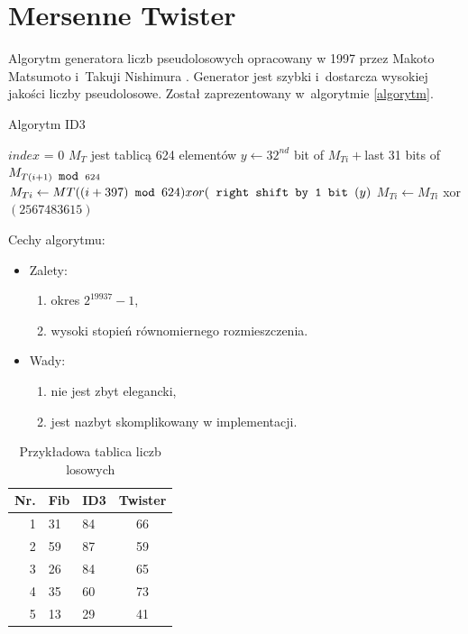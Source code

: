 \documentclass[12pt,a4paper]{article}
\begin{document}
\section{Mersenne Twister}
Algorytm generatora liczb pseudolosowych opracowany w 1997 przez Makoto
Matsumoto i~Takuji Nishimura \cite{klucz2}. Generator jest szybki i~dostarcza wysokiej
jakości liczby pseudolosowe. Został zaprezentowany w~algorytmie \ref{algorytm}.\\
\begin{algorithm}[h!]
\caption{Algorytm ID3}
\label{algorytm}
\begin{algorithmic}[1]
\REQUIRE $index$ = 0
\ENSURE $M_T$ jest tablicą 624 elementów
\STATE $y\leftarrow 32^{nd}$ bit of $M_{Ti}+$last 31 bits of $M_{T(i+1) \verb" mod " 624}$
\STATE $M_{Ti}\leftarrow M{T((i+397) \verb" mod " 624) xor (\verb" right shift by 1 bit "(y)}$
\STATE $M_{Ti}\leftarrow M_{Ti}$ xor $(2 567 483 615)$
\ENDIF
\ENDFOR
\ENDIF
\end{algorithmic}
\end{algorithm}

Cechy algorytmu:
\begin{itemize}
\item Zalety:
\begin{enumerate}
\item okres $2^{19937}-1$,
\item wysoki stopień równomiernego rozmieszczenia.
\end{enumerate}
\item Wady:
\begin{enumerate}
\item nie jest zbyt elegancki,
\item jest nazbyt skomplikowany w implementacji.
\end{enumerate}
\end{itemize}

\begin{table}[h!]
\centering
\begin{tabular}{rllc}
\textbf{Nr.}&\textbf{Fib}&\textbf{ID3}&\textbf{Twister} \\ \hline
1 & 31 & 84 & 66 \\
2 & 59 & 87 & 59 \\
3 & 26 & 84 & 65 \\
4 & 35 & 60 & 73 \\
5 & 13 & 29 & 41 \\ \hline 
\end{tabular}
\caption{Przykładowa tablica liczb losowych}
\label{tablica1}
\end{table}
\end{document}
